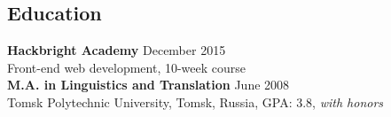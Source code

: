 \documentclass[10pt,line,letterpaper]{res}
\begin{document}
\begin{resume}
\section{Education}
    {\bf Hackbright Academy} \hfill December 2015 \\ Front-end web development, 10-week course \\
    {\bf M.A. in Linguistics and Translation} \hfill June 2008 \\Tomsk Polytechnic University, Tomsk, Russia, GPA: 3.8, \textit{with honors}

\end{resume}
\end{document}
